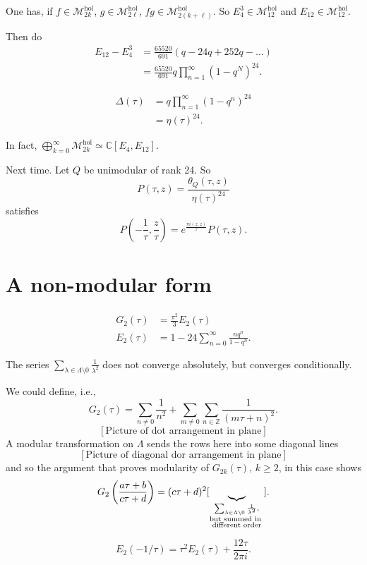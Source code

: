 \noindent
One has, if $f \in \mathcal{M}_{2k}^{\text{hol}}$,
$g \in \mathcal{M}_{2\ell}^{\text{hol}}$,
$fg \in \mathcal{M}^{\text{hol}}_{2(k+\ell)}$.
So $E^3_4 \in \mathcal{M}^{\text{hol}}_{12}$ and
$E_{12}\in \mathcal{M}_{12}^{\text{hol}}$.

Then do
\begin{align*}
E_{12}-E^3_4&=\frac{65520}{691}(q-24q+252q-\ldots)\\
&=\frac{65520}{691}q\prod_{n=1}^\infty(1-q^N)^{24}.
\end{align*}

\begin{remark}
\label{remark-dedekind}
\begin{align*}
\Delta(\tau)&=q\prod_{n=1}^\infty(1-q^n)^{24}\\
&=\eta(\tau)^{24}.
\end{align*}

\noindent
In fact, $\bigoplus_{k=0}^\infty\mathcal{M}_{2k}^{\text{hol}}
\simeq\mathbb{C}[E_4,E_{12}]$.
\end{remark}

\medskip\noindent
Next time. Let $Q$ be unimodular of rank 24.
So
$$
P(\tau,z)=\frac{\theta_Q(\tau,z)}{\eta(\tau)^{24}}
$$
satisfies
$$
P\left(-\frac{1}{\tau},\frac{z}{\tau}\right)
=e^{\frac{\pi i (z,z)}{\tau}}P(\tau,z).
$$

\section{A non-modular form}
\label{section-a-non-modular-form}

\noindent
\begin{align*}
G_2(\tau)&=\frac{\pi^2}{3}E_2(\tau)\\
E_2(\tau)&=1-24\sum_{n=0}^\infty\frac{n q^n}{1-q^n}.
\end{align*}

\noindent
The series $\sum_{\lambda \in \Lambda\setminus 0}\frac{1}{\lambda^2}$ 
does not converge absolutely, but converges conditionally.

We could define, i.e.,
$$
G_2(\tau)=\sum_{ n \neq 0}\frac{1}{n^2}
+\sum_{m \neq 0}\sum_{n \in \mathbb{Z}}
\frac{1}{(m\tau+n)^2}.
$$
$$
[\text{Picture of dot arrangement in plane}]
$$
A modular transformation on $\Lambda$ 
sends the rows here into some diagonal lines
$$
[\text{Picture of diagonal dor arrangement in plane}]
$$
and so the argument that proves modularity of
$G_{2k}(\tau)$, $k\geq 2$, in this case shows
$$
G_2\left(\frac{a\tau+b}{c\tau+d}\right)
=(c\tau+d)^2[\underbrace{\leavevmode}_{
\substack{\sum_{\lambda \in \Lambda \setminus 0}\frac{1}{\lambda^2}, \\
 \text{but summed in }\\
\text{different order}}}].
$$
\begin{proposition}
\label{proposition-e2}
$$
E_2(-1/\tau)=\tau^2E_2(\tau)+\frac{12\tau}{2\pi i}.
$$
\end{proposition}

